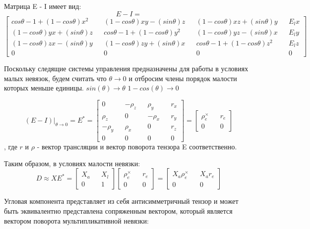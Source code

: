 \documentclass[a4paper]{article}
\begin{document}
Матрица E - I имеет вид:
\begin{equation*} E - I = \end{equation*}
\begin{equation} 
\begin{bmatrix}
cos\theta-1+(1-cos\theta)x^2   && (1-cos\theta)xy-(sin\theta)z && (1-cos\theta)xz + (sin\theta)y && E_lx\\
(1-cos\theta)yx+(sin\theta)z && cos\theta-1+(1-cos\theta)y^2   && (1-cos\theta)yz - (sin\theta)x && E_ly\\
(1-cos\theta)zx-(sin\theta)y && (1-cos\theta)zy+(sin\theta)x && cos\theta-1+(1-cos\theta)z^2	   && E_lz\\
0&&0&&0&&0
\end{bmatrix}
\end{equation}

Поскольку следящие системы управления предназначены для работы в условиях малых невязок, будем считать что $\theta \rightarrow 0$ и отбросим члены порядок малости которых меньше единицы.
$sin(\theta) \rightarrow \theta$
$1 - cos(\theta) \rightarrow 0$

$$
(E - I)|_{\theta\rightarrow0} = E^* = 
\begin{bmatrix}
0         && -\rho_z &&  \rho_y && r_x\\
 \rho_z && 0         && -\rho_x && r_y\\
-\rho_y &&  \rho_x && 0         && r_z\\
0&&0&&0&&0
\end{bmatrix} = \begin{bmatrix}\rho_e^\times&&r_e\\0&&0\end{bmatrix}
$$
, где $r$ и $\rho$ - вектор трансляции и вектор поворота тензора E соответственно.

Таким образом, в условиях малости невязки:
\begin{equation} D \approx X E^* = \begin{bmatrix}X_a&&X_l\\0&&1\end{bmatrix} \begin{bmatrix}\rho_e^\times&&r_e\\0&&0\end{bmatrix} = \begin{bmatrix}X_a\rho_e^\times&&X_ar_e\\0&&0\end{bmatrix} \end{equation}

Угловая компонента представляет из себя антисимметричный тензор и может быть эквивалентно представлена сопряженным вектором, который является вектором поворота мультипликативной невязки:
\end{document}
